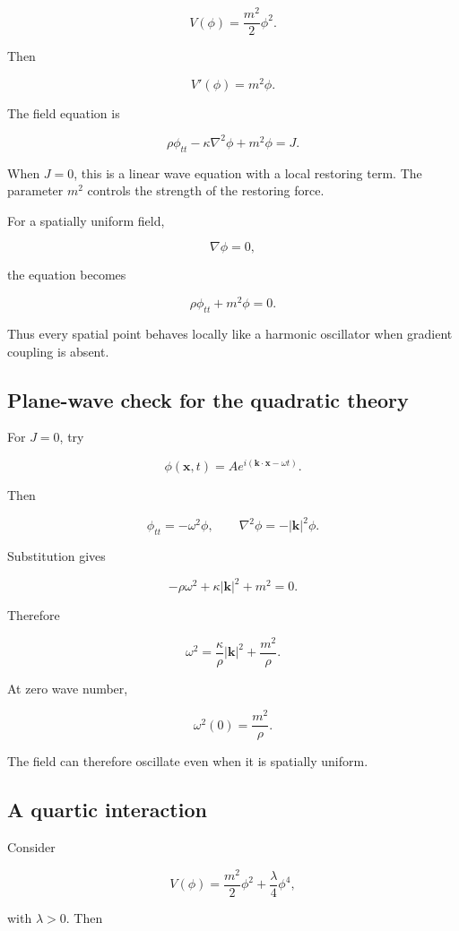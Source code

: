 \[
V(\phi)
=
\frac{m^{2}}{2}\phi^{2}.
\]

Then

\[
V'(\phi)=m^{2}\phi.
\]

The field equation is

\[
\boxed{
\rho\phi_{tt}
-
\kappa\nabla^{2}\phi
+
m^{2}\phi
=
J
}.
\]

When \(J=0\), this is a linear wave equation with a local restoring term. The parameter \(m^{2}\) controls the strength of the restoring force.

For a spatially uniform field,

\[
\nabla\phi=0,
\]

the equation becomes

\[
\rho\phi_{tt}+m^{2}\phi=0.
\]

Thus every spatial point behaves locally like a harmonic oscillator when gradient coupling is absent.

\subsection{Plane-wave check for the quadratic theory}

For \(J=0\), try

\[
\phi(\mathbf{x},t)
=
A e^{i(\mathbf{k}\cdot\mathbf{x}-\omega t)}.
\]

Then

\[
\phi_{tt}=-\omega^{2}\phi,
\qquad
\nabla^{2}\phi=-|\mathbf{k}|^{2}\phi.
\]

Substitution gives

\[
-\rho\omega^{2}
+
\kappa|\mathbf{k}|^{2}
+
m^{2}
=0.
\]

Therefore

\[
\boxed{
\omega^{2}
=
\frac{\kappa}{\rho}|\mathbf{k}|^{2}
+
\frac{m^{2}}{\rho}
}.
\]

At zero wave number,

\[
\omega^{2}(0)=\frac{m^{2}}{\rho}.
\]

The field can therefore oscillate even when it is spatially uniform.

\subsection{A quartic interaction}

Consider

\[
V(\phi)
=
\frac{m^{2}}{2}\phi^{2}
+
\frac{\lambda}{4}\phi^{4},
\]

with \(\lambda>0\). Then

